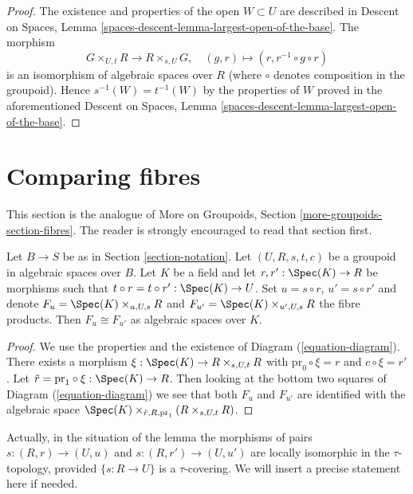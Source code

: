 \begin{proof}
The existence and properties of the open $W \subset U$ are described in
Descent on Spaces, Lemma \ref{spaces-descent-lemma-largest-open-of-the-base}.
The morphism
$$
G \times_{U, t} R \longrightarrow R \times_{s, U} G, \quad
(g, r) \longmapsto (r, r^{-1} \circ g \circ r)
$$
is an isomorphism of algebraic spaces over $R$ (where $\circ$ denotes
composition in the groupoid). Hence $s^{-1}(W) = t^{-1}(W)$ by the
properties of $W$ proved in the aforementioned
Descent on Spaces, Lemma \ref{spaces-descent-lemma-largest-open-of-the-base}.
\end{proof}




\section{Comparing fibres}
\label{section-fibres}

\noindent
This section is the analogue of
More on Groupoids, Section \ref{more-groupoids-section-fibres}.
The reader is strongly encouraged to read that section first.

\begin{lemma}
\label{lemma-two-fibres}
Let $B \to S$ be as in Section \ref{section-notation}.
Let $(U, R, s, t, c)$ be a groupoid in algebraic spaces over $B$.
Let $K$ be a field and let $r, r' : \Spec(K) \to R$
be morphisms such that $t \circ r = t \circ r' : \Spec(K) \to U$.
Set $u = s \circ r$, $u' = s \circ r'$ and denote
$F_u = \Spec(K) \times_{u, U, s} R$ and
$F_{u'} = \Spec(K) \times_{u', U, s} R$ the fibre products.
Then $F_u \cong F_{u'}$ as algebraic spaces over $K$.
\end{lemma}

\begin{proof}
We use the properties and the existence of
Diagram (\ref{equation-diagram}).
There exists a morphism $\xi : \Spec(K) \to R \times_{s, U, t} R$
with $\text{pr}_0 \circ \xi = r$ and $c \circ \xi = r'$.
Let $\tilde r = \text{pr}_1 \circ \xi : \Spec(K) \to R$.
Then looking at the bottom two squares of
Diagram (\ref{equation-diagram})
we see that both $F_u$ and $F_{u'}$ are identified with the algebraic space
$\Spec(K) \times_{\tilde r, R, \text{pr}_1} (R \times_{s, U, t} R)$.
\end{proof}

\noindent
Actually, in the situation of the lemma the morphisms of pairs
$s : (R, r) \to (U, u)$ and $s : (R, r') \to (U, u')$ are
locally isomorphic in the $\tau$-topology, provided $\{s: R \to U\}$ is a
$\tau$-covering. We will insert a precise statement here if needed.









